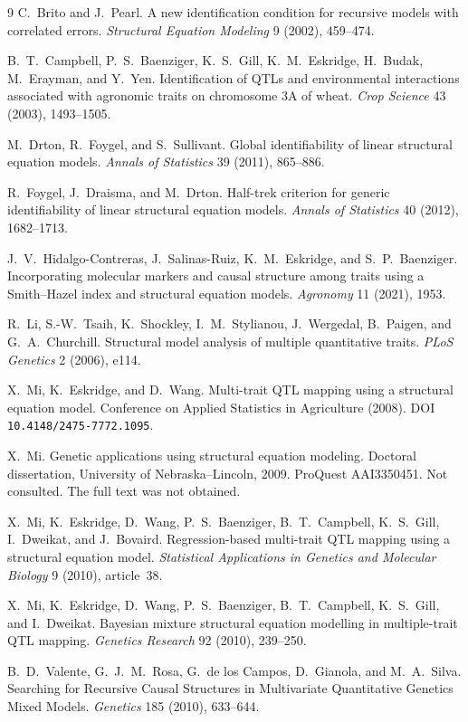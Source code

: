 \documentclass[11pt]{article}
\begin{document}
\begin{thebibliography}{9}
C.~Brito and J.~Pearl.
A new identification condition for recursive models with correlated errors.
\emph{Structural Equation Modeling} 9 (2002), 459--474.

B.~T.~Campbell, P.~S.~Baenziger, K.~S.~Gill, K.~M.~Eskridge, H.~Budak,
M.~Erayman, and Y.~Yen.
Identification of QTLs and environmental interactions associated with
agronomic traits on chromosome 3A of wheat.
\emph{Crop Science} 43 (2003), 1493--1505.

M.~Drton, R.~Foygel, and S.~Sullivant.
Global identifiability of linear structural equation models.
\emph{Annals of Statistics} 39 (2011), 865--886.

R.~Foygel, J.~Draisma, and M.~Drton.
Half-trek criterion for generic identifiability of linear structural
equation models.
\emph{Annals of Statistics} 40 (2012), 1682--1713.

J.~V.~Hidalgo-Contreras, J.~Salinas-Ruiz, K.~M.~Eskridge, and
S.~P.~Baenziger.
Incorporating molecular markers and causal structure among traits using a
Smith--Hazel index and structural equation models.
\emph{Agronomy} 11 (2021), 1953.

R.~Li, S.-W.~Tsaih, K.~Shockley, I.~M.~Stylianou, J.~Wergedal, B.~Paigen,
and G.~A.~Churchill.
Structural model analysis of multiple quantitative traits.
\emph{PLoS Genetics} 2 (2006), e114.

X.~Mi, K.~Eskridge, and D.~Wang.
Multi-trait QTL mapping using a structural equation model.
Conference on Applied Statistics in Agriculture (2008).
DOI \texttt{10.4148/2475-7772.1095}.

X.~Mi.
Genetic applications using structural equation modeling.
Doctoral dissertation, University of Nebraska--Lincoln, 2009.
ProQuest AAI3350451. Not consulted. The full text was not obtained.

X.~Mi, K.~Eskridge, D.~Wang, P.~S.~Baenziger, B.~T.~Campbell, K.~S.~Gill,
I.~Dweikat, and J.~Bovaird.
Regression-based multi-trait QTL mapping using a structural equation model.
\emph{Statistical Applications in Genetics and Molecular Biology} 9 (2010),
article~38.

X.~Mi, K.~Eskridge, D.~Wang, P.~S.~Baenziger, B.~T.~Campbell, K.~S.~Gill,
and I.~Dweikat.
Bayesian mixture structural equation modelling in multiple-trait QTL mapping.
\emph{Genetics Research} 92 (2010), 239--250.

B.~D.~Valente, G.~J.~M.~Rosa, G.~de los Campos, D.~Gianola, and M.~A.~Silva.
Searching for Recursive Causal Structures in Multivariate Quantitative
Genetics Mixed Models.
\emph{Genetics} 185 (2010), 633--644.
\end{thebibliography}
\end{document}
